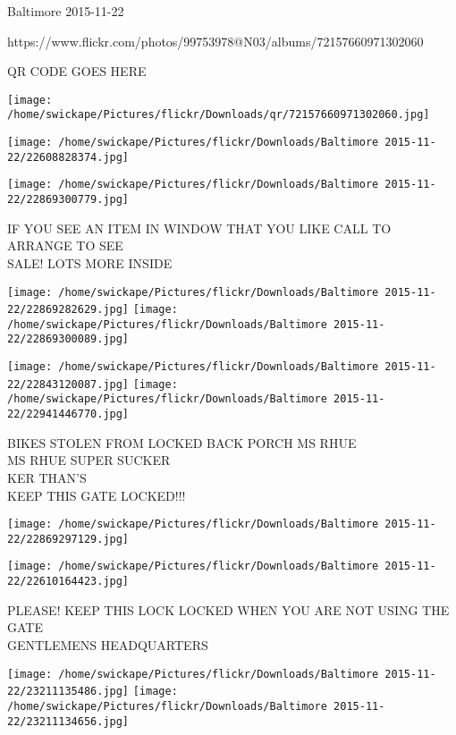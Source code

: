 \documentclass[10pt,letterpaper]{article}
\begin{document}
Baltimore 2015-11-22

https://www.flickr.com/photos/99753978@N03/albums/72157660971302060

QR CODE GOES HERE

\texttt{[image: /home/swickape/Pictures/flickr/Downloads/qr/72157660971302060.jpg]}
\pagebreak

\texttt{[image: /home/swickape/Pictures/flickr/Downloads/Baltimore 2015-11-22/22608828374.jpg]}

\vspace{0.25in}
\texttt{[image: /home/swickape/Pictures/flickr/Downloads/Baltimore 2015-11-22/22869300779.jpg]}

IF YOU SEE AN ITEM IN WINDOW THAT YOU LIKE CALL TO ARRANGE TO SEE\\
SALE!  LOTS MORE INSIDE\\
\pagebreak

\texttt{[image: /home/swickape/Pictures/flickr/Downloads/Baltimore 2015-11-22/22869282629.jpg]}
\texttt{[image: /home/swickape/Pictures/flickr/Downloads/Baltimore 2015-11-22/22869300089.jpg]}

\texttt{[image: /home/swickape/Pictures/flickr/Downloads/Baltimore 2015-11-22/22843120087.jpg]}
\texttt{[image: /home/swickape/Pictures/flickr/Downloads/Baltimore 2015-11-22/22941446770.jpg]}

BIKES STOLEN FROM LOCKED BACK PORCH MS RHUE\\
MS RHUE SUPER SUCKER\\
KER THAN'S\\
KEEP THIS GATE LOCKED!!!\\
\pagebreak

\texttt{[image: /home/swickape/Pictures/flickr/Downloads/Baltimore 2015-11-22/22869297129.jpg]}

\vspace{0.25in}
\texttt{[image: /home/swickape/Pictures/flickr/Downloads/Baltimore 2015-11-22/22610164423.jpg]}

PLEASE!  KEEP THIS LOCK LOCKED WHEN YOU ARE NOT USING THE GATE\\
GENTLEMENS HEADQUARTERS\\
\pagebreak

\texttt{[image: /home/swickape/Pictures/flickr/Downloads/Baltimore 2015-11-22/23211135486.jpg]}
\texttt{[image: /home/swickape/Pictures/flickr/Downloads/Baltimore 2015-11-22/23211134656.jpg]}
\end{document}
